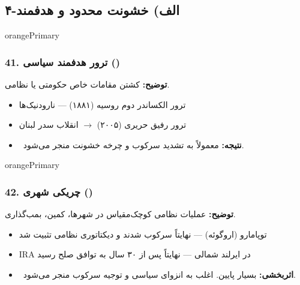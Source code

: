 \documentclass[a4paper,12pt]{article}
\newcommand{\methodnum}[1]{\textcolor{purpleLight}{\textbf{#1.}}}
\begin{document}
\subsection{\textcolor{orangePrimary}{\faCircle[regular]} ۴-الف) خشونت محدود و هدفمند}

\begin{methodcard}{orangePrimary}
\subsubsection{\methodnum{41} ترور هدفمند سیاسی ()}
\textbf{توضیح:} کشتن مقامات خاص حکومتی یا نظامی.

\begin{itemize}
  \item ترور الکساندر دوم روسیه (۱۸۸۱) — نارودنیک‌ها
  \item ترور رفیق حریری (۲۰۰۵) $\rightarrow$ انقلاب سدر لبنان
\end{itemize}
\begin{itemize}[label=\textcolor{redPrimary}{\faExclamationTriangle}]
  \item \textcolor{orangePrimary}{\faExclamationTriangle\ \textbf{نتیجه:}} معمولاً به تشدید سرکوب و چرخه خشونت منجر می‌شود.
\end{itemize}
\end{methodcard}

\begin{methodcard}{orangePrimary}
\subsubsection{\methodnum{42} چریکی شهری ()}
\textbf{توضیح:} عملیات نظامی کوچک‌مقیاس در شهرها، کمین، بمب‌گذاری.

\begin{itemize}
  \item توپامارو (اروگوئه) — نهایتاً سرکوب شدند و دیکتاتوری نظامی تثبیت شد
  \item IRA در ایرلند شمالی — نهایتاً پس از ۳۰ سال به توافق صلح رسید
\end{itemize}
\begin{itemize}[label=\textcolor{redPrimary}{\faExclamationTriangle}]
  \item \textcolor{orangePrimary}{\faExclamationTriangle\ \textbf{اثربخشی:}} بسیار پایین. اغلب به انزوای سیاسی و توجیه سرکوب منجر می‌شود.
\end{itemize}
\end{methodcard}
\end{document}
